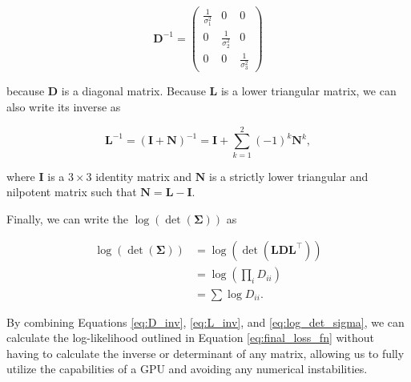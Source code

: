 \documentclass[twocolumn]{aastex63}
\begin{document}
\begin{CJK*}{UTF8}{gbsn}
\begin{equation}
\boldsymbol{D}^{-1}=\left(\begin{array}{ccc}
\frac{1}{\sigma_{1}^{2}} & 0 & 0 \\
0 & \frac{1}{\sigma_{2}^{2}} & 0 \\
0 & 0 & \frac{1}{\sigma_{3}^{2}}
\end{array}\right)
\label{eq:D_inv}
\end{equation}

\noindent
because $\boldsymbol{D}$ is a diagonal matrix. Because $\boldsymbol{L}$ is a lower triangular matrix, we can also write its inverse as  

\begin{equation}
\boldsymbol{L}^{-1}=(\boldsymbol{I}+\boldsymbol{N})^{-1}= \boldsymbol{I} +\sum_{k=1}^{2}(-1)^{k} \boldsymbol{N}^{k} ,
\label{eq:L_inv}
\end{equation}

\noindent
where $\boldsymbol{I}$ is a $3\times3$ identity matrix and $\boldsymbol{N}$ is a strictly lower triangular and nilpotent matrix such that $\boldsymbol{N} = \boldsymbol{L} - \boldsymbol{I}$.

Finally, we can write the $\log (\operatorname{det}(\boldsymbol{\Sigma}))$ as

\begin{equation}
\begin{split}
\log (\operatorname{det}(\boldsymbol{\Sigma})) 
& = \log (\operatorname{det} (\boldsymbol{L}\boldsymbol{D}\boldsymbol{L}^{\top})) \\
& = \log (\prod_i D_{ii}) \\
& = \sum \log D_{ii} .
\end{split}
\label{eq:log_det_sigma}
\end{equation}

\noindent
By combining Equations \ref{eq:D_inv}, \ref{eq:L_inv}, and \ref{eq:log_det_sigma}, we can calculate the log-likelihood outlined in Equation \ref{eq:final_loss_fn} without having to calculate the inverse or determinant of any matrix, allowing us to fully utilize the capabilities of a GPU and avoiding any numerical instabilities. 


\end{CJK*}
\end{document}
